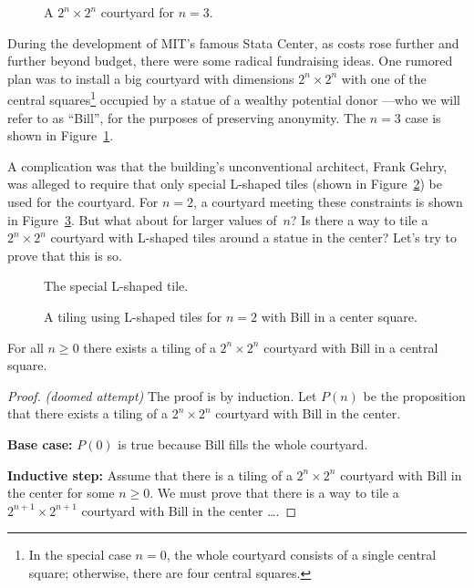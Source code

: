 \begin{figure}


\caption{A $2^n \times 2^n$ courtyard for $n = 3$.}
\label{fig:2nx2n-tile}
\end{figure}

During the development of MIT's famous Stata Center, as costs rose
further and further beyond budget, there were some radical fundraising
ideas.  One rumored plan was to install a big courtyard with
dimensions $2^n \times 2^n$ with one of the central
squares\footnote{In the special case $n = 0$, the whole courtyard
consists of a single central square; otherwise, there are four central
squares.} occupied by a statue of a wealthy potential donor ---who we
will refer to as ``Bill'', for the purposes of preserving anonymity.
The $n = 3$ case is shown in Figure~\ref{fig:2nx2n-tile}.

A complication was that the building's unconventional architect, Frank
Gehry, was alleged to require that only special L-shaped tiles (shown
in Figure~\ref{fig:Ltile}) be used for the courtyard.  For $n = 2$, a
courtyard meeting these constraints is shown in
Figure~\ref{fig:2Ltile}.  But what about for larger values of~$n$?  Is
there a way to tile a $2^n \times 2^n$ courtyard with L-shaped tiles
around a statue in the center?  Let's try to prove that this is so.

\begin{figure}


\caption{The special L-shaped tile.}
\label{fig:Ltile}
\end{figure}

\begin{figure}


\caption{A tiling using L-shaped tiles for $n = 2$ with Bill in a
  center square.}
\label{fig:2Ltile}
\end{figure}

\begin{theorem}\label{bill}
For all $n \geq 0$ there exists a tiling of a $2^n \times 2^n$
courtyard with Bill in a central square.
\end{theorem}

\begin{proof}
\emph{(doomed attempt)} The proof is by induction.  Let $P(n)$ be the
proposition that there exists a tiling of a $2^n \times 2^n$ courtyard
with Bill in the center.

\textbf{Base case:} $P(0)$ is true because Bill fills the whole courtyard.

\textbf{Inductive step:} Assume that there is a tiling of a
$2^n \times 2^n$ courtyard with Bill in the center for some $n \geq
0$.  We must prove that there is a way to tile a $2^{n+1} \times
2^{n+1}$ courtyard with Bill in the center \dots.
\end{proof}

